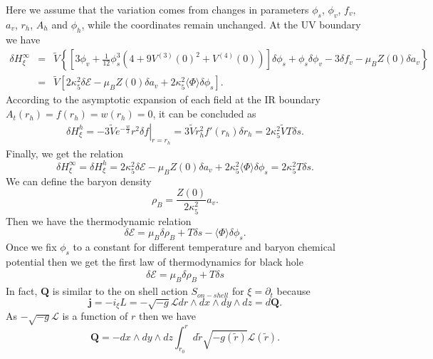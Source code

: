 \documentclass[a4paper,12pt]{article}
\numberwithin{equation}{section}
\begin{document}
Here we assume that the variation comes from changes in parameters $\phi_s$, $\phi_v$, $f_v$, $a_v$, $r_h$, $A_h$ and $\phi_h$, while the coordinates remain unchanged. At the UV boundary we have
\begin{eqnarray}
    \delta H_{\xi}^{\infty}&=&\tilde{V}\left\{\left[3\phi_v+\frac{1}{12}\phi_s^3\left(4+9 V^{(3)}(0)^2+V^{(4)}(0)\right)\right]\delta \phi_s+\phi_s\delta\phi_v-3\delta f_v-\mu_B Z(0) \delta a_v\right\} \nonumber \\
    &=&\tilde{V}\left[2\kappa_5^2 \delta \mathcal{E}-\mu_B Z(0) \delta a_v+2\kappa_5^2\langle \Phi\rangle\delta \phi_s\right].
\end{eqnarray}
According to the asymptotic expansion of each field at the IR boundary $A_t(r_h)=f(r_h)=w(r_h)=0$, it can be concluded as
\begin{eqnarray}
\delta H_{\xi}^{h}=-\left.3\tilde{V} e^{-\frac{w}{2}}r^2\delta f\right|_{r=r_h}=3 \tilde{V}r_h^2 f'(r_h)\delta r_h=2\kappa_5^2\tilde{V} T\delta s.
\end{eqnarray}
Finally, we get the relation
\begin{equation}
    \delta H_{\xi}^{\infty}=\delta H_{\xi}^{h} =2\kappa_5^2 \delta \mathcal{E}-\mu_B Z(0) \delta a_v+2\kappa_5^2\langle \Phi\rangle\delta \phi_s=2\kappa_5^2 T\delta s.
\end{equation}
We can define the baryon density 
\begin{equation}
    \rho_B=\frac{Z(0) }{2\kappa_5^2}a_v.
\end{equation}
Then we have the thermodynamic relation
\begin{equation}
     \delta \mathcal{E}=\mu_B \delta \rho_B+ T\delta s-\langle \Phi\rangle\delta \phi_s.
\end{equation}
Once we fix $\phi_s$ to a constant for different temperature and baryon chemical potential then we get the first law of thermodynamics for black hole
\begin{eqnarray}\label{eq418}
    \delta \mathcal{E}=\mu_B \delta \rho_B+ T\delta s
\end{eqnarray}
In fact, $\mathbf{Q}$ is similar to the on shell action $S_{on-shell}$ for $\xi=\partial_t$ because
\begin{equation}
    \mathbf{j}=-i_{\xi}L=-\sqrt{-g}\mathcal{L}dr \wedge dx \wedge dy \wedge dz=d\mathbf{Q}.
\end{equation}
As $-\sqrt{-g}\mathcal{L}$ is a function of $r$ then we have
\begin{equation}
    \mathbf{Q}=-dx \wedge dy \wedge dz\int_{r_0}^r d\tilde{r} \sqrt{-g(\tilde{r})}\mathcal{L}(\tilde{r}).
\end{equation}
\end{document}
